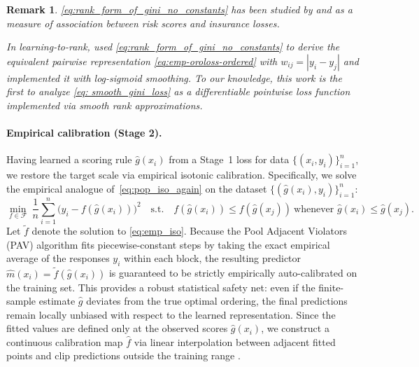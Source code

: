 \documentclass[11pt]{article}
\theoremstyle{plain}
\theoremstyle{plain}
\theoremstyle{plain}
\theoremstyle{plain}
\theoremstyle{plain}
\theoremstyle{plain}
\theoremstyle{plain}
\newtheorem*{remark*}{Remark}
\begin{document}
\begin{remark*}
    \eqref{eq:rank_form_of_gini_no_constants} has been studied by \citet{frees2011summarizing} and \citet{yitzhaki2012more} as a measure of association between risk scores and insurance losses. 
    
    In learning-to-rank, \citet{wang2018lambdaloss} used \eqref{eq:rank_form_of_gini_no_constants} to derive the equivalent pairwise representation \eqref{eq:emp-oroloss-ordered} with $w_{ij} = |y_i-y_j|$ and implemented it with log-sigmoid smoothing. To our knowledge, this work is the first to analyze \eqref{eq: smooth_gini_loss} as a differentiable pointwise loss function implemented via smooth rank approximations.
\end{remark*}

\label{sec:calib-empirical}

 

\paragraph{Empirical calibration (Stage 2).}
Having learned a scoring rule $\hat{g}(x_i)$ from a Stage~1 loss for data $\{(x_i,y_i)\}_{i=1}^n$, we restore the target scale via empirical isotonic calibration. Specifically, we solve the empirical analogue of~\eqref{eq:pop_iso_again} on the dataset $\{(\hat{g}(x_i),y_i)\}_{i=1}^n$:
\begin{equation}
\label{eq:emp_iso}
\min_{f \in \mathcal{F}}\ \frac{1}{n}\sum_{i=1}^n \big(y_i- f(\hat{g}(x_i))\big)^2
\quad \text{s.t.}\quad f(\hat{g}(x_i))\le  f(\hat{g}(x_j))\ \text{whenever } \hat{g}(x_i)\le \hat{g}(x_j).
\end{equation}
Let $\tilde{f}$ denote the solution to \eqref{eq:emp_iso}. Because the Pool Adjacent Violators (PAV) algorithm fits piecewise-constant steps by taking the exact empirical average of the responses $y_i$ within each block, the resulting predictor $\hat{m}(x_i) = \tilde{f}(\hat{g}(x_i))$ is guaranteed to be strictly empirically auto-calibrated on the training set. This provides a robust statistical safety net: even if the finite-sample estimate $\hat{g}$ deviates from the true optimal ordering, the final predictions remain locally unbiased with respect to the learned representation. Since the fitted values are defined only at the observed scores $\hat{g}(x_i)$, we construct a continuous calibration map $\hat{f}$ via linear interpolation between adjacent fitted points and clip predictions outside the training range \citep{pedregosa2011scikit}.
\end{document}
